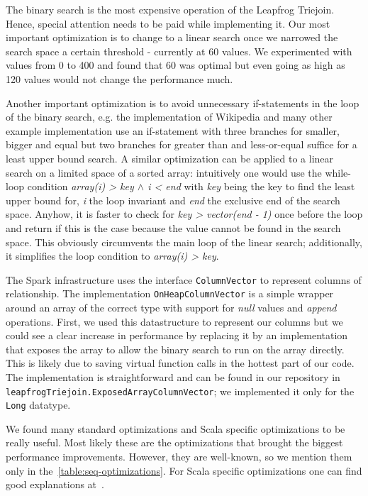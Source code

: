 The binary search is the most expensive operation of the Leapfrog Triejoin.
Hence, special attention needs to be paid while implementing it.
Our most important optimization is to change to a linear search once we narrowed the search space a certain threshold - currently at 60 values.
We experimented with values from 0 to 400 and found that 60 was optimal but even going as high as 120 values would not change the performance much.

Another important optimization is to avoid unnecessary if-statements in the loop of the binary search, e.g. the implementation of Wikipedia and many other
example implementation use an if-statement with three branches for smaller, bigger and equal but two branches for greater than and less-or-equal suffice for a least upper bound search.
A similar optimization can be applied to a linear search on a limited space of a sorted array: intuitively one would use the while-loop condition \textit{array(i) > key $\wedge$ i < end} with
\textit{key} being the key to find the least upper bound for, \textit{i} the loop invariant and \textit{end} the exclusive end of the search space.
Anyhow, it is faster to check for \textit{key > vector(end - 1)} once before the loop and return if this is the case because the value cannot be found in the search space.
This obviously circumvents the main loop of the linear search;
additionally, it simplifies the loop condition to \textit{array(i) > key}.

The Spark infrastructure uses the interface \texttt{ColumnVector} to represent columns of relationship.
The implementation \texttt{OnHeapColumnVector} is a simple wrapper around an array of the correct type with support for \textit{null} values and \textit{append} operations.
First, we used this datastructure to represent our columns but we could see a clear increase in performance by replacing it by an implementation that exposes the array
to allow the binary search to run on the array directly.
This is likely due to saving virtual function calls in the hottest part of our code.
The implementation is straightforward and can be found in our repository in \texttt{leapfrogTriejoin.ExposedArrayColumnVector}; we implemented it only for the \texttt{Long} datatype.

We found many standard optimizations and Scala specific optimizations to be really useful.
Most likely these are the optimizations that brought the biggest performance improvements.
However, they are well-known, so we mention them only in the~\cref{table:seq-optimizations}.
For Scala specific optimizations one can find good explanations at~\cite{databricks-scala-guide}.


